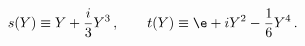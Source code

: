 \begin{equation}
s(Y) \equiv Y+\frac{i}{3}Y^3\,,\qquad t(Y) \equiv \e+iY^2-\frac{1}{6}Y^4\,.
\end{equation}


